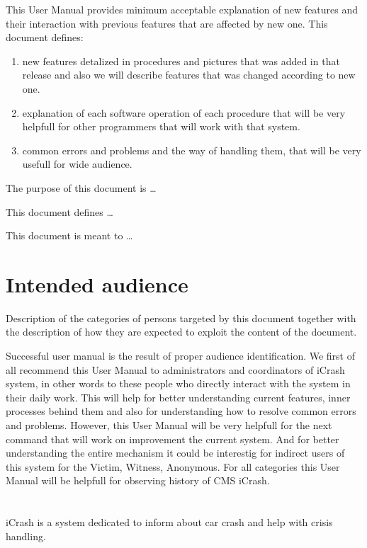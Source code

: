This User Manual provides minimum acceptable explanation of new
features and their interaction with previous features that are affected by new
one. This document defines:
\begin{enumerate}
  \item new features detalized in procedures and pictures that
was added in that release and also we will describe features that was changed according to new one. 
\item explanation of each software operation of each procedure that will be very helpfull for other programmers that will work with that system.
\item common errors and problems and the way of handling them, that
will be very usefull for wide audience. 
\end{enumerate} 


The purpose of this document is \ldots

This document defines \ldots

This document is meant to \ldots



\section{Intended audience}
Description of the categories of persons targeted by this document together with
the description of how they are expected to exploit the content of the document.

Successful user manual is the result of proper audience identification. We first
of all recommend this User Manual to administrators and coordinators of iCrash
system, in other words to these people who directly interact with the
system in their daily work. This will help for better understanding current
features, inner processes behind them and also for understanding how to resolve common errors
and problems. However, this User Manual will be very helpfull for the next command that will
work on improvement the current system. And for better understanding the entire mechanism it could be interestig for indirect users of this system for the Victim, Witness, Anonymous.
For all categories this User Manual will be helpfull for observing history of
CMS iCrash. 


\section{\mysystemname}
iCrash is a system dedicated to inform about car crash and help with crisis
handling.



